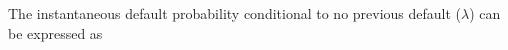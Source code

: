 %
%
%
%
%
%
%
%
The instantaneous default probability conditional to no previous default ($\lambda$) can be expressed as

